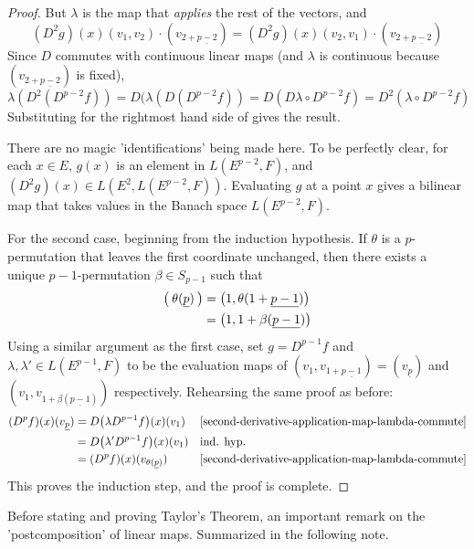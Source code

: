 \documentclass[../main-manifolds.tex]{subfiles}
\begin{document}
\begin{proof}
    But $\lambda$ is the map that \emph{applies} the rest of the vectors, and
    \begin{equation}\label{second-derivative-D2g-equality}
        (D^2g)(x)(v_1,v_2)\cdot (v_{2+\underline{p-2}}) = (D^2g)(x)(v_2,v_1)\cdot (v_{2+\underline{p-2}})
    \end{equation}
    Since $D$ commutes with continuous linear maps (and $\lambda$ is continuous because $(v_{2+\underline{p-2}})$ is fixed),
    \begin{equation}\label{second-derivative-application-map-lambda-commute}
       \lambda(D^2(D^{p-2}f)) = D(\lambda(D(D^{p-2}f)) = D(D\lambda\circ D^{p-2}f) = D^2(\lambda\circ D^{p-2}f) 
    \end{equation}
    Substituting  for the rightmost hand side of  gives the result.
    \begin{note}
        There are no magic 'identifications' being made here. To be perfectly clear, for each $x\in E$, $g(x)$ is an element in $L(E^{p-2}, F)$, and $(D^2g)(x)\in L(E^2, L(E^{p-2}, F))$. Evaluating $g$ at a point $x$ gives a bilinear map that takes values in the Banach space $L(E^{p-2}, F)$.
    \end{note}

    For the second case, beginning from the induction hypothesis. If $\theta$ is a $p$-permutation that leaves the first coordinate unchanged, then there exists a unique $p-1$-permutation $\beta\in S_{p-1}$ such that
    \begin{align}\label{multi-derivatives-theta-def}
    \qty\big(\:\theta(\underline{p})\:) &= \qty\big(1,\theta(1+\underline{p-1}))\nonumber\\
    &= \qty\big(1,1+\beta(\underline{p-1}))    
    \end{align}
    Using a similar argument as the first case, set $g = D^{p-1}f$ and $\lambda, \lambda' \in L(E^{p-1}, F)$ to be the evaluation maps of $(v_1, v_{1+\underline{p-1}}) = (v_{\underline{p}})$ and $(v_1, v_{1+\beta(\underline{p-1})})$ respectively. Rehearsing the same proof as before:
    \begin{align*}
        (D^pf)(x)(v_{\underline{p}}) &= D\qty\big(\lambda D^{p-1}f)(x)(v_1)&&\text{\Cref{second-derivative-application-map-lambda-commute}}\\
        &= D\qty\big(\lambda' D^{p-1}f)(x)(v_1) &&\text{ind. hyp.}\\
        &= (D^pf)(x)(v_{\theta(\underline{p})})&&\text{\Cref{second-derivative-application-map-lambda-commute}}
    \end{align*}
    This proves the induction step, and the proof is complete.
    
\end{proof}
Before stating and proving Taylor's Theorem, an important remark on the 'postcomposition' of linear maps. Summarized in the following note. 
\end{document}
